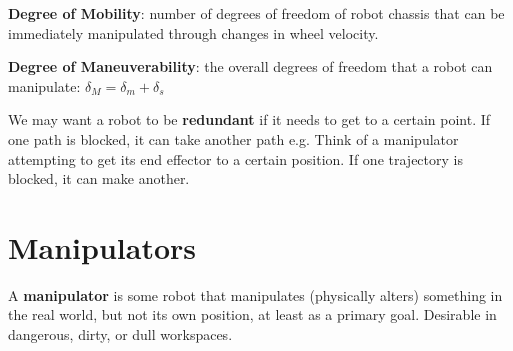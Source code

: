 \documentclass[13pt]{article}
\begin{document}
\hfill

\noindent
\textbf{Degree of Mobility}: number of degrees of freedom of robot chassis that can be immediately manipulated through
changes in wheel velocity.

\hfill

\noindent
\textbf{Degree of Maneuverability}: the overall degrees of freedom that a robot can manipulate: $\delta_{M} = \delta_{m}
+ \delta_{s}$

\hfill

\noindent
We may want a robot to be \textbf{redundant} if it needs to get to a certain point. If one path is blocked, it can take
another path e.g. Think of a manipulator attempting to get its end effector to a certain position. If one trajectory is
blocked, it can make another.

\section{Manipulators}%

A \textbf{manipulator} is some robot that manipulates (physically alters) something in the real world, but not its own
position, at least as a primary goal. Desirable in dangerous, dirty, or dull workspaces.

\hfill

\noindent
\end{document}
